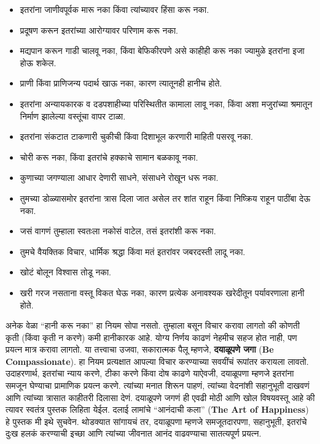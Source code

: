 \begin{itemize}
 \item इतरांना जाणीवपूर्वक मारू नका किंवा त्यांच्यावर हिंसा करू नका.
 \item प्रदूषण करून इतरांच्या आरोग्यावर परिणाम करू नका.
 \item मद्यपान करून गाडी चालवू नका, किंवा बेफिकीरपणे असे काहीही करू नका ज्यामुळे इतरांना इजा होऊ शकेल.
 \item प्राणी किंवा प्राणिजन्य पदार्थ खाऊ नका, कारण त्यातूनही हानीच होते.
 \item इतरांना अन्यायकारक व दडपशाहीच्या परिस्थितीत कामाला लावू नका, किंवा अशा मजुरांच्या श्रमातून निर्माण झालेल्या वस्तूंचा वापर टाळा.
 \item इतरांना संकटात टाकणारी चुकीची किंवा दिशाभूल करणारी माहिती पसरवू नका.
 \item चोरी करू नका, किंवा इतरांचे हक्काचे सामान बळकावू नका.
 \item कुणाच्या जगण्याला आधार देणारी साधने, संसाधने रोखून धरू नका.
 \item तुमच्या डोळ्यासमोर इतरांना त्रास दिला जात असेल तर शांत राहून किंवा निष्क्रिय राहून पाठींबा देऊ नका.
 \item जसं वागणं तुम्हाला स्वतःला नकोसं वाटेल, तसं इतरांशी करू नका.
 \item तुमचे वैयक्तिक विचार, धार्मिक श्रद्धा किंवा मतं इतरांवर जबरदस्ती लादू नका.
 \item खोटं बोलून विश्वास तोडू नका.
 \item खरी गरज नसताना वस्तू विकत घेऊ नका,  कारण प्रत्येक अनावश्यक खरेदीतून पर्यावरणाला हानी होते.
 \end{itemize}
अनेक वेळा “हानी करू नका” हा नियम सोपा नसतो. तुम्हाला बसून विचार करावा लागतो की कोणती कृती (किंवा कृती न करणे) कमी हानीकारक आहे. योग्य निर्णय काढणं नेहमीच सहज होत नाही, पण प्रयत्न मात्र करावा लागतो.
या तत्त्वाचा उजवा, सकारात्मक पैलू म्हणजे,  \textbf{दयाळूपणे जगा} (\textbf {Be Compassionate}). हा नियम प्रत्यक्षात आपल्या विचार करण्याच्या सवयींचं रूपांतर करायला लावतो. उदाहरणार्थ, इतरांचा न्याय करणे, टीका करणे किंवा दोष काढणे याऐवजी, दयाळूपणा म्हणजे इतरांना समजून घेण्याचा प्रामाणिक प्रयत्न करणे. त्यांच्या मनात शिरून पाहणं, त्यांच्या वेदनांशी सहानुभूती दाखवणं आणि त्यांच्या त्रासात काहीतरी दिलासा देणं.
दयाळूपणे जगणं ही एवढी मोठी आणि खोल विषयवस्तू आहे की त्यावर स्वतंत्र पुस्तक लिहिता येईल. दलाई लामांचे “आनंदाची कला” (\textbf {The Art of Happiness}) हे पुस्तक मी इथे सुचवेन. थोडक्यात सांगायचं तर, दयाळूपणा म्हणजे समजूतदारपणा, सहानुभूती, इतरांचे दुःख हलकं करण्याची इच्छा आणि त्यांच्या जीवनात आनंद वाढवण्याचा सातत्यपूर्ण प्रयत्न.


